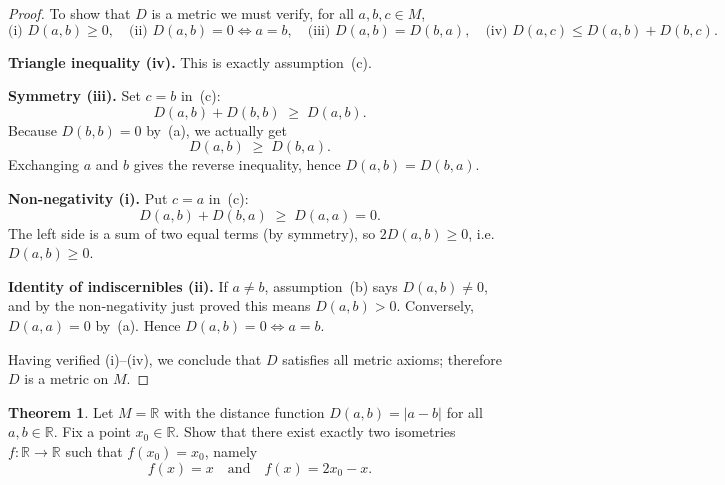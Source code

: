 \documentclass[12pt]{article}
\theoremstyle{definition} %
\newtheorem{theorem}{Theorem}
\theoremstyle{plain} %
\begin{document}
    \begin{proof}
    To show that $D$ is a metric we must verify, for all $a,b,c\in M$,
    \[
    \text{(i) } D(a,b)\ge0,\quad
    \text{(ii) } D(a,b)=0\iff a=b,\quad
    \text{(iii) } D(a,b)=D(b,a),\quad
    \text{(iv) } D(a,c)\le D(a,b)+D(b,c).
    \]
    
    \smallskip
    \noindent\textbf{Triangle inequality (iv).}  
    This is exactly assumption~(c).
    
    \smallskip
    \noindent\textbf{Symmetry (iii).}  
    Set $c=b$ in~(c):
    \[
      D(a,b)+D(b,b)\;\ge\;D(a,b).
    \]
    Because $D(b,b)=0$ by~(a), we actually get
    \[
      D(a,b)\;\ge\;D(b,a).
    \]
    Exchanging $a$ and $b$ gives the reverse inequality, hence
    $D(a,b)=D(b,a)$.
    
    \smallskip
    \noindent\textbf{Non‑negativity (i).}  
    Put $c=a$ in~(c):
    \[
      D(a,b)+D(b,a)\;\ge\;D(a,a)=0.
    \]
    The left side is a sum of two equal terms (by symmetry), so
    $2D(a,b)\ge0$, i.e.\ $D(a,b)\ge0$.
    
    \smallskip
    \noindent\textbf{Identity of indiscernibles (ii).}  
    If $a\ne b$, assumption~(b) says $D(a,b)\ne0$, and by the
    non‑negativity just proved this means $D(a,b)>0$.  
    Conversely, $D(a,a)=0$ by~(a).  
    Hence $D(a,b)=0\iff a=b$.
    
    \smallskip
    \noindent
    Having verified (i)–(iv), we conclude that $D$ satisfies all metric
    axioms; therefore $D$ is a metric on $M$.
    \end{proof}
    \begin{theorem}
        Let $M = \mathbb{R}$ with the distance function $D(a,b) = |a - b|$ for all $a,b \in \mathbb{R}$. 
        Fix a point $x_0 \in \mathbb{R}$.  Show that there exist exactly two isometries $f : \mathbb{R}\to \mathbb{R}$ 
        such that $f(x_0) = x_0$, namely
        \[
        f(x) = x \quad \text{and} \quad f(x) = 2x_0 - x.
        \]
        \end{theorem}
        
\end{document}
